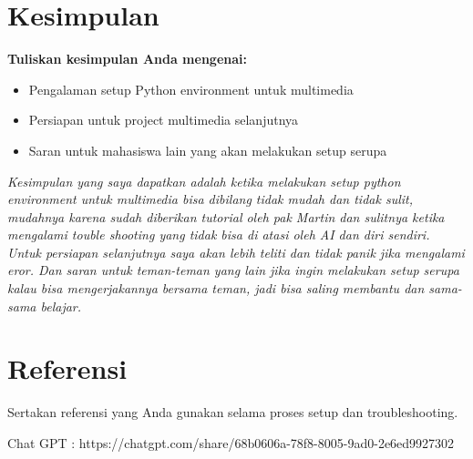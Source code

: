 \documentclass[11pt,a4paper]{article}
\begin{document}
\section{Kesimpulan}
\textbf{Tuliskan kesimpulan Anda mengenai:}
\begin{itemize}
    \item Pengalaman setup Python environment untuk multimedia
    \item Persiapan untuk project multimedia selanjutnya
    \item Saran untuk mahasiswa lain yang akan melakukan setup serupa
\end{itemize}

\textit{Kesimpulan yang saya dapatkan adalah ketika melakukan setup python environment untuk multimedia bisa dibilang tidak mudah dan tidak sulit, mudahnya karena sudah diberikan tutorial oleh pak Martin dan sulitnya ketika mengalami touble shooting yang tidak bisa di atasi oleh AI dan diri sendiri. Untuk persiapan selanjutnya saya akan lebih teliti dan tidak panik jika mengalami eror. Dan saran untuk teman-teman yang lain jika ingin melakukan setup serupa kalau bisa mengerjakannya bersama teman, jadi bisa saling membantu dan sama-sama belajar.}

\section{Referensi}
Sertakan referensi yang Anda gunakan selama proses setup dan troubleshooting.

\newpage


Chat GPT : https://chatgpt.com/share/68b0606a-78f8-8005-9ad0-2e6ed9927302
\end{document}

